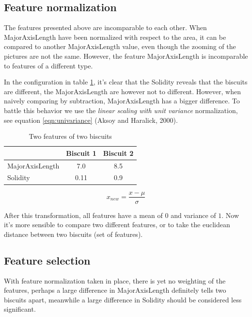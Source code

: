 \documentclass[a4paper,11pt]{article}
\begin{document}
\subsection{Feature normalization}
The features presented above are incomparable to each other.
When MajorAxisLength have been normalized with respect to the area, 
it can be compared to another MajorAxisLength value, 
even though the zooming of the pictures are not the same. 
However, the feature MajorAxisLength is incomparable to features of a different type.

In the configuration in table \ref{tab:features}, it's clear that the Solidity reveals that the biscuits
are different, the MajorAxisLength are however not to different.
However, when naively comparing by subtraction, MajorAxisLength has a bigger difference.
To battle this behavior we use the \emph{linear scaling with unit variance} normalization, see equation \ref{eqn:univariance} (Aksoy and Haralick, 2000).

\begin{table}[h!b!p!]
\caption{Two features of two biscuits}
\begin{center}
    \begin{tabular}{ l | c | c | }
                    & Biscuit 1 & Biscuit 2 \\ \hline
    MajorAxisLength & 7.0       & 8.5       \\ \hline
    Solidity        & 0.11      & 0.9       \\ \hline
    \end{tabular}
\end{center}
\label{tab:features}
\end{table}

\begin{equation}
x_{new} = \frac{x - \mu}{\sigma}
\label{eqn:univariance}
\end{equation}

After this transformation, all features have a mean of $0$ and variance of $1$.
Now it's more sensible to compare two different features, or to take the euclidean distance between two biscuits (set of features).
\subsection{Feature selection}
With feature normalization taken in place, there is yet no weighting of the features,
perhaps a large difference in MajorAxisLength definitely tells two biscuits apart,
meanwhile a large difference in Solidity should be considered less significant.
\end{document}
